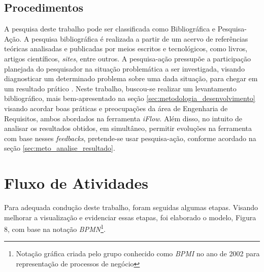 \subsection{Procedimentos}
A pesquisa deste trabalho pode ser classificada como Bibliográfica e Pesquisa-Ação. A pesquisa bibliográfica é realizada a partir de um acervo de referências teóricas analisadas e publicadas por meios escritos e tecnológicos, como livros, artigos científicos, \textit{sites}, entre outros. A pesquisa-ação pressupõe a participação planejada do pesquisador na situação problemática a ser investigada, visando diagnosticar um determinado problema sobre uma dada situação, para chegar em um resultado prático \cite{gil2002elaborar}. Neste trabalho, buscou-se realizar um levantamento bibliográfico, mais bem-apresentado na seção \ref{sec:metodologia_desenvolvimento} visando acordar boas práticas e preocupações da área de Engenharia de Requisitos, ambos abordados na ferramenta \textit{iFlow}. Além disso, no intuito de analisar os resultados obtidos, em simultâneo, permitir evoluções na ferramenta com base nesses \textit{feedbacks}, pretende-se usar pesquisa-ação, conforme acordado na seção \ref{sec:meto_analise_resultado}.

\section{Fluxo de Atividades}

\label{sec:fluxo_atividade}
    
Para adequada condução deste trabalho, foram seguidas algumas etapas. Visando melhorar a visualização e evidenciar essas etapas, foi elaborado o modelo, Figura 8, com base na notação \textit{BPMN}\footnote{Notação gráfica criada pelo grupo conhecido como \textit{BPMI} no ano de 2002 para representação de processos de negócio}.

